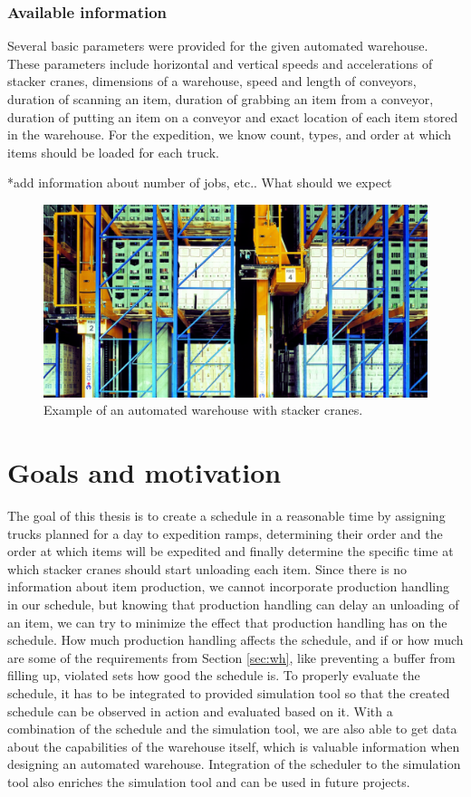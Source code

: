 \documentclass{ctuthesis}
\begin{document}
\subsubsection{Available information}

Several basic parameters were provided for the given automated warehouse. These parameters include horizontal and vertical speeds and accelerations of stacker cranes, dimensions of a warehouse, speed and length of conveyors, duration of scanning an item, duration of grabbing an item from a conveyor, duration of putting an item on a conveyor and exact location of each item stored in the warehouse. For the expedition, we know count, types, and order at which items should be loaded for each truck. 

*add information about number of jobs, etc.. What should we expect

\begin{figure}
\includegraphics[width=0.8\linewidth]{highbaywarehouse.jpg}
\caption{Example of an automated warehouse with stacker cranes. \cite{warehousepic}}
\label{fig:foobar}
\end{figure}

\section{Goals and motivation}

The goal of this thesis is to create a schedule in a reasonable time by assigning trucks planned for a day to expedition ramps, determining their order and the order at which items will be expedited and finally determine the specific time at which stacker cranes should start unloading each item. Since there is no information about item production, we cannot incorporate production handling in our schedule, but knowing that production handling can delay an unloading of an item, we can try to minimize the effect that production handling has on the schedule. How much production handling affects the schedule, and if or how much are some of the requirements from Section \ref{sec:wh}, like preventing a buffer from filling up, violated sets how good the schedule is. To properly evaluate the schedule, it has to be integrated to provided simulation tool so that the created schedule can be observed in action and evaluated based on it. With a combination of the schedule and the simulation tool, we are also able to get data about the capabilities of the warehouse itself, which is valuable information when designing an automated warehouse. Integration of the scheduler to the simulation tool also enriches the simulation tool and can be used in future projects.
\end{document}
